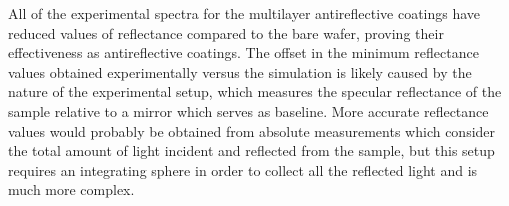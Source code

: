 All of the experimental spectra for the multilayer antireflective coatings have reduced values of reflectance compared to the bare wafer, proving their effectiveness as antireflective coatings. The offset in the minimum reflectance values obtained experimentally versus the simulation is likely caused by the nature of the experimental setup, which measures the specular reflectance of the sample relative to a mirror which serves as baseline. More accurate reflectance values would probably be obtained from absolute measurements which consider the total amount of light incident and reflected from the sample, but this setup requires an integrating sphere in order to collect all the reflected light and is much more complex. 